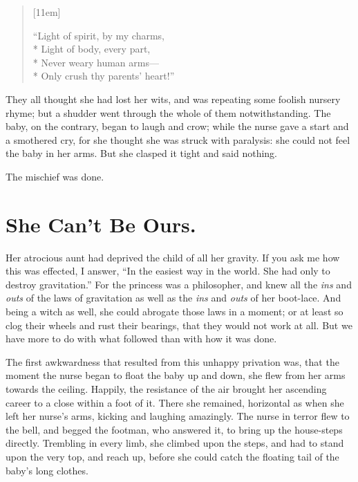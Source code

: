 \documentclass[12pt]{memoir}
\begin{document}
\begin{itshape}
\begin{verse}[11em]
\begin{altverse}
``Light of spirit, by my charms,\\*
Light of body, every part,\\*
Never weary human arms---\\*
Only crush thy parents' heart!''
\end{altverse}
\end{verse}
\end{itshape}

They all thought she had lost her wits, and was repeating some foolish
nursery rhyme; but a shudder went through the whole of them
notwithstanding.  The baby, on the contrary, began to laugh and crow;
while the nurse gave a start and a smothered cry, for she thought she
was struck with paralysis: she could not feel the baby in her arms.
But she clasped it tight and said nothing.

The mischief was done.


\chapter{She Can't Be Ours.}


Her atrocious aunt had deprived the child of all her gravity.  If you
ask me how this was effected, I answer, ``In the easiest way in the
world.  She had only to destroy gravitation.''  For the princess was a
philosopher, and knew all the \emph{ins} and \emph{outs} of the laws
of gravitation as well as the \emph{ins} and \emph{outs} of her
boot-lace.  And being a witch as well, she could abrogate those laws
in a moment; or at least so clog their wheels and rust their bearings,
that they would not work at all.  But we have more to do with what
followed than with how it was done.

The first awkwardness that resulted from this unhappy privation was,
that the moment the nurse began to float the baby up and down, she
flew from her arms towards the ceiling.  Happily, the resistance of
the air brought her ascending career to a close within a foot of it.
There she remained, horizontal as when she left her nurse's arms,
kicking and laughing amazingly.  The nurse in terror flew to the bell,
and begged the footman, who answered it, to bring up the house-steps
directly.  Trembling in every limb, she climbed upon the steps, and
had to stand upon the very top, and reach up, before she could catch
the floating tail of the baby's long clothes.
\end{document}
